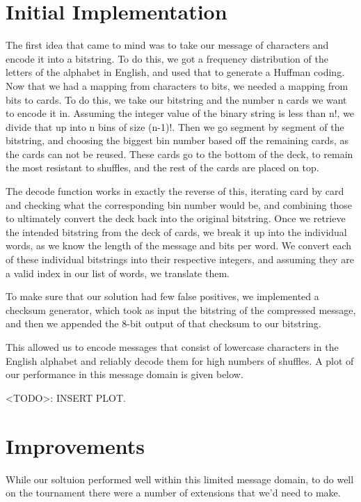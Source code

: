 \documentclass{article}
\begin{document}
\section{Initial Implementation}

The first idea that came to mind was to take our message of characters and encode it into a bitstring. To do this, we got a frequency distribution of the letters of the alphabet in English, and used that to generate a Huffman coding. Now that we had a mapping from characters to bits, we needed a mapping from bits to cards. To do this, we take our bitstring and the number n cards we want to encode it in. Assuming the integer value of the binary string is less than n!, we divide that up into n bins of size (n-1)!. Then we go segment by segment of the bitstring, and choosing the biggest bin number based off the remaining cards, as the cards can not be reused. These cards go to the bottom of the deck, to remain the most resistant to shuffles, and the rest of the cards are placed on top. 

The decode function works in exactly the reverse of this, iterating card by card and checking what the corresponding bin number would be, and combining those to ultimately convert the deck back into the original bitstring. Once we retrieve the intended bitstring from the deck of cards, we break it up into the individual words, as we know the length of the message and bits per word. We convert each of these individual bitstrings into their respective integers, and assuming they are a valid index in our list of words, we translate them. 

To make sure that our solution had few false positives, we implemented a checksum generator, which took as input the bitstring of the compressed message, and then we appended the 8-bit output of that checksum to our bitstring.

This allowed us to encode messages that consist of lowercase characters in the English alphabet and reliably decode them for high numbers of shuffles. A plot of our performance in this message domain is given below.

<TODO>: INSERT PLOT.

\section{Improvements}

While our soltuion performed well within this limited message domain, to do well on the tournament there were a number of extensions that we'd need to make. 
\end{document}
